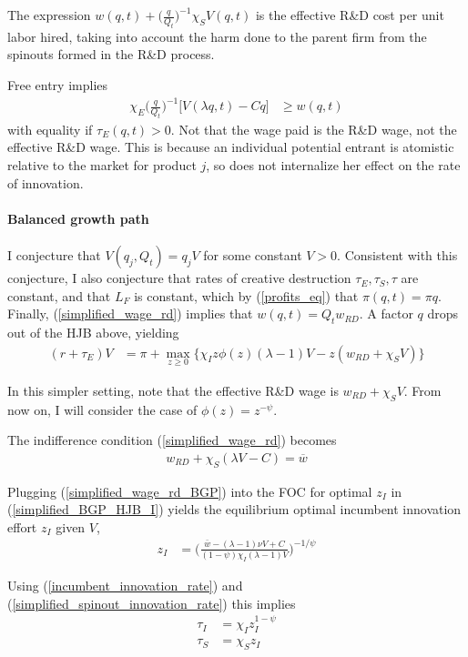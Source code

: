 \documentclass[11pt,english]{article}
\theoremstyle{remark}
\begin{document}
The expression $w(q,t) +\Big(\frac{q}{Q_t}\Big)^{-1} \chi_S V(q,t)$ is the effective R\&D cost per unit labor hired, taking into account the harm done to the parent firm from the spinouts formed in the R\&D process.

Free entry implies
\begin{align}
\chi_E \Big(\frac{q}{Q_t}\Big)^{-1} \Big[ V(\lambda q,t) - Cq \Big]  &\ge w(q,t)  \nonumber
\end{align}
with equality if $\tau_E(q,t) > 0$. Not that the wage paid is the R\&D wage, not the effective R\&D wage. This is because an individual potential entrant is atomistic relative to the market for product $j$, so does not internalize her effect on the rate of innovation.

\paragraph{Balanced growth path}

I conjecture that $V(q_j,Q_t) = q_j V$ for some constant $V > 0$. Consistent with this conjecture, I also conjecture that rates of creative destruction $\tau_E,\tau_S,\tau$ are constant, and that $L_F$ is constant, which by (\ref{profits_eq}) that $\pi(q,t) = \pi q$. Finally, (\ref{simplified_wage_rd}) implies that $w(q,t) = Q_t w_{RD}$. A factor $q$ drops out of the HJB above, yielding
\begin{align}
(r + \tau_E) V &= \pi + \max_{z \ge 0} \Big\{  \chi_I z \phi(z) (\lambda -1) V - z (w_{RD} + \chi_S V ) \Big\} \label{simplified_BGP_HJB_I}
\end{align} 

In this simpler setting, note that the effective R\&D wage is $w_{RD} + \chi_S V$. From now on, I will consider the case of $\phi(z) = z^{-\psi}$. 

The indifference condition (\ref{simplified_wage_rd}) becomes 
\begin{align}
w_{RD} + \chi_S (\lambda V - C) = \overline{w} \label{simplified_wage_rd_BGP}
\end{align}

Plugging (\ref{simplified_wage_rd_BGP}) into the FOC for optimal $z_I$ in (\ref{simplified_BGP_HJB_I}) yields the equilibrium optimal incumbent innovation effort $z_I$ given $V$, 
\begin{align*}
z_I &= \Big(  \frac{\bar{w}-(\lambda-1)\nu V + C}{(1-\psi)\chi_I(\lambda-1)V} \Big)^{-1/\psi}	
\end{align*}

Using (\ref{incumbent_innovation_rate}) and (\ref{simplified_spinout_innovation_rate}) this implies
\begin{align*}
\tau_I &= \chi_I z_I^{1-\psi} \\
\tau_S &= \chi_S z_I
\end{align*}
\end{document}
